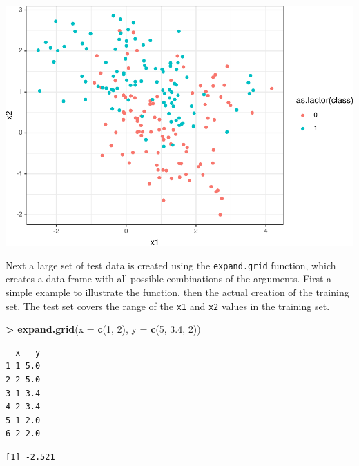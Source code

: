 \documentclass[]{krantz}
\makeatletter
\newenvironment{Shaded}{\begin{snugshade}}{\end{snugshade}}
\newcommand{\DataTypeTok}[1]{\textcolor[rgb]{0.27,0.27,0.27}{#1}}
\newcommand{\DecValTok}[1]{\textcolor[rgb]{0.06,0.06,0.06}{#1}}
\newcommand{\FloatTok}[1]{\textcolor[rgb]{0.06,0.06,0.06}{#1}}
\newcommand{\KeywordTok}[1]{\textcolor[rgb]{0.27,0.27,0.27}{\textbf{#1}}}
\newcommand{\NormalTok}[1]{#1}
\newcommand{\OperatorTok}[1]{\textcolor[rgb]{0.43,0.43,0.43}{\textbf{#1}}}
\newcommand{\StringTok}[1]{\textcolor[rgb]{0.5,0.5,0.5}{#1}}
\newenvironment{kframe}{%
\medskip{}
\setlength{\fboxsep}{.8em}
 \def\at@end@of@kframe{}%
 \ifinner\ifhmode%
  \def\at@end@of@kframe{\end{minipage}}%
  \begin{minipage}{\columnwidth}%
 \fi\fi%
 \def\FrameCommand##1{\hskip\@totalleftmargin \hskip-\fboxsep
 \colorbox{shadecolor}{##1}\hskip-\fboxsep
     \hskip-\linewidth \hskip-\@totalleftmargin \hskip\columnwidth}%
 \MakeFramed {\advance\hsize-\width
   \@totalleftmargin\z@ \linewidth\hsize
   \@setminipage}}%
 {\par\unskip\endMakeFramed%
 \at@end@of@kframe}
\renewenvironment{Shaded}{\begin{kframe}}{\end{kframe}}
\makeatother
\begin{document}
\includegraphics{bookdown_files/figure-latex/unnamed-chunk-236-1.pdf}

Next a large set of test data is created using the \texttt{expand.grid} function, which creates a data frame with all possible combinations of the arguments. First a simple example to illustrate the function, then the actual creation of the training set. The test set covers the range of the \texttt{x1} and \texttt{x2} values in the training set.

\begin{Shaded}
\begin{Highlighting}[]
\OperatorTok{>}\StringTok{ }\KeywordTok{expand.grid}\NormalTok{(}\DataTypeTok{x =} \KeywordTok{c}\NormalTok{(}\DecValTok{1}\NormalTok{, }\DecValTok{2}\NormalTok{), }\DataTypeTok{y =} \KeywordTok{c}\NormalTok{(}\DecValTok{5}\NormalTok{, }\FloatTok{3.4}\NormalTok{, }\DecValTok{2}\NormalTok{))}
\end{Highlighting}
\end{Shaded}

\begin{verbatim}
  x   y
1 1 5.0
2 2 5.0
3 1 3.4
4 2 3.4
5 1 2.0
6 2 2.0
\end{verbatim}

\begin{Shaded}
\end{Shaded}

\begin{verbatim}
[1] -2.521
\end{verbatim}
\end{document}
